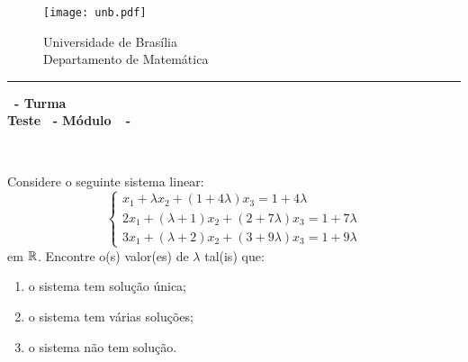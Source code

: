 \documentclass[12pt]{exam}
\begin{document}
    \begin{figure}[h]
        \begin{minipage}[c]{1.7cm}
            \texttt{[image: unb.pdf]}
        \end{minipage}
        \hspace{0pt}
        \begin{minipage}[c]{4in}
            {Universidade de Brasília} \\
            {Departamento de Matemática}
        \end{minipage}
    \end{figure}
    \hrule
    \begin{center}
        {\Large\bf \disciplina\ - Turma \turma}  \\
         {\large\bf Teste \numeroteste\ - Módulo\ \modulo\ -\ \dataavaliacao}
    \end{center}

    \\
    \vspace*{.01cm}

    \vspace{.4cm}

    \questao{} Considere o seguinte sistema linear:
    \[
        \begin{cases}
            x_1 + \lambda x_2 + (1 + 4\lambda )x_3 = 1 + 4\lambda \\
            2x_1 + (\lambda  + 1)x_2 + (2 + 7\lambda )x_3 = 1 + 7\lambda \\
            3x_1 + (\lambda  + 2)x_2 + (3 + 9\lambda )x_3 = 1 + 9\lambda
        \end{cases}
    \]
em $\mathbb{R}$. Encontre o(s) valor(es) de $\lambda$ tal(is) que:
\begin{enumerate}[label={\alph*})]
    \item o sistema tem solução única;

    \item o sistema tem várias soluções;

    \item o sistema não tem solução.
\end{enumerate}
\end{document}
